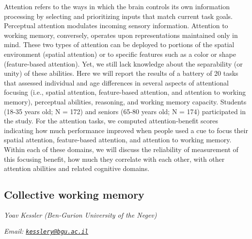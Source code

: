\documentclass[
  12pt,
]{book}
\begin{document}
Attention refers to the ways in which the brain controls its own information processing by selecting and prioritizing inputs that match current task goals. Perceptual attention modulates incoming sensory information. Attention to working memory, conversely, operates upon representations maintained only in mind. These two types of attention can be deployed to portions of the spatial environment (spatial attention) or to specific features such as a color or shape (feature-based attention). Yet, we still lack knowledge about the separability (or unity) of these abilities. Here we will report the results of a battery of 20 tasks that assessed individual and age differences in several aspects of attentional focusing (i.e., spatial attention, feature-based attention, and attention to working memory), perceptual abilities, reasoning, and working memory capacity. Students (18-35 years old; N = 172) and seniors (65-80 years old; N = 174) participated in the study. For the attention tasks, we computed attention-benefit scores indicating how much performance improved when people used a cue to focus their spatial attention, feature-based attention, and attention to working memory. Within each of these domains, we will discuss the reliability of measurement of this focusing benefit, how much they correlate with each other, with other attention abilities and related cognitive domains.

\hypertarget{collective-working-memory}{%
\subsection{Collective working memory}\label{collective-working-memory}}

\emph{Yoav Kessler (Ben-Gurion University of the Negev)}

\emph{Email: \href{mailto:kesslery@bgu.ac.il}{\nolinkurl{kesslery@bgu.ac.il}}}
\end{document}

